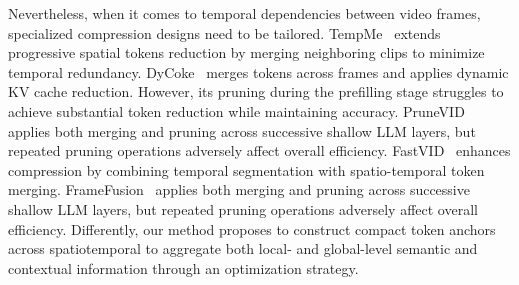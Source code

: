Nevertheless, when it comes to temporal dependencies between video frames, specialized compression designs need to be tailored. TempMe~\cite{shen2024tempme} extends progressive spatial tokens reduction by merging neighboring clips to minimize temporal redundancy.
DyCoke~\cite{tao2025dycoke} merges tokens across frames and applies dynamic KV cache reduction. However, its pruning during the prefilling stage struggles to achieve substantial token reduction while maintaining accuracy. PruneVID~\cite{huang2024prunevid} applies both merging and pruning across successive shallow LLM layers, but repeated pruning operations adversely affect overall efficiency. FastVID~\cite{shen2025fastvid} enhances compression by combining temporal segmentation with spatio-temporal token merging. FrameFusion~\cite{fu2024framefusion} applies both merging and pruning across successive shallow LLM layers, but repeated pruning operations adversely affect overall efficiency. Differently, our method proposes to construct compact token anchors across spatiotemporal to aggregate both local- and global-level semantic and contextual information through an optimization strategy.


